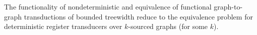 \begin{corollary}
The functionality of nondeterministic and equivalence of functional graph-to-graph \mso transductions of bounded treewidth reduce to the equivalence problem for deterministic register transducers over $k$-sourced graphs (for some $k$). 
\end{corollary}

